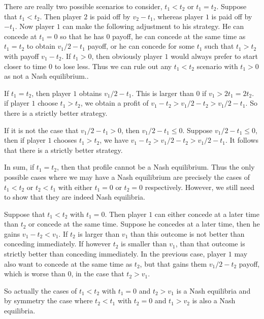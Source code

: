 \documentclass{tufte-handout}
\theoremstyle{definition}
\theoremstyle{remark}
\begin{document}
There are really two possible scenarios to consider, $t_1< t_2$ or $t_1=t_2$. Suppose that $t_1<t_2$. Then player $2$ is paid off by $v_2-t_1$, whereas player $1$ is paid off by $-t_1$. Now player $1$ can make the following adjustment to his strategy. He can concede at $t_1=0$ so that he has $0$ payoff, he can concede at the same time as $t_1=t_2$ to obtain $v_1/2-t_1$ payoff, or he can concede for some $t_1$ such that $t_1>t_2$ with payoff $v_1-t_2$. If $t_1>0$, then obviously player $1$ would always prefer to start closer to time $0$ to lose less. Thus we can rule out any $t_1<t_2$ scenario with $t_1>0$ as not a Nash equilibrium..


If $t_1=t_2$, then player $1$ obtains $v_1/2-t_1$. This is larger than $0$ if $v_1> 2t_1=2t_2$.  if player $1$ choose $t_1 > t_2$, we obtain a profit of $v_1-t_2>v_1/2-t_2>v_1/2-t_1$. So there is a strictly better strategy.

If it is not the case that $v_1/2-t_1>0$, then $v_1/2-t_1 \leq 0$. Suppose $v_1/2-t_1\leq0$, then if player $1$ chooses $t_1>t_2$, we have $v_1-t_2>v_1/2-t_2> v_1/2-t_1$. It follows that there is a strictly better strategy.


In sum, if $t_1=t_2$, then that profile cannot be a Nash equilibrium. Thus the only possible cases where we may have a Nash equilibrium are precisely the cases of $t_1<t_2$ or $t_2<t_1$ with either $t_1=0$ or $t_2=0$ respectively. However, we still need to show that they are indeed Nash equilibria.

Suppose that $t_1<t_2$ with $t_1=0$. Then player $1$ can either concede at a later time than $t_2$ or concede at the same time. Suppose he concedes at a later time, then he gains $v_1-t_2< v_1$. If $t_2$ is larger than $v_1$ than this outcome is not better than conceding immediately. If however $t_2$ is smaller than $v_1$, than that outcome is strictly better than conceding immediately.
In the previous case, player $1$ may also want to concede at the same time as $t_2$, but that gains them $v_1/2-t_2$ payoff, which is worse than $0$, in the case that $t_2>v_1$.

So actually the cases of $t_1<t_2$ with $t_1=0$ and $t_2>v_1$ is a Nash equilibria and by symmetry the case where $t_2<t_1$ with $t_2=0$ and $t_1>v_2$ is also a Nash equilibria.

\newpage
\end{document}
